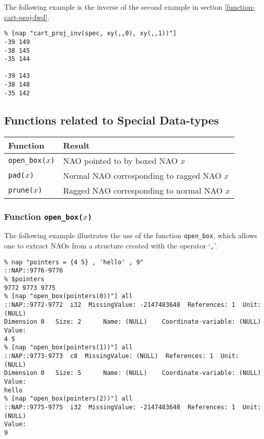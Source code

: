 The following example is the inverse of the second example in section 
\ref{function-cart-proj-fwd}.
\begin{verbatim}
% [nap "cart_proj_inv(spec, xy(,,0), xy(,,1))"]
-39 149
-38 145
-35 144

-39 143
-38 148
-35 142
\end{verbatim}

\subsection{Functions related to Special Data-types}
    \label{function-Special-Data-types}

  \begin{tabular}{|l|l|}
    \hline 
      \textbf{Function} & \textbf{Result}
    \\
      \hline 
      \hline 
        \texttt{open\_box(}$x$\texttt{)} & NAO pointed to by boxed NAO $x$
      \\
      \hline 
        \texttt{pad(}$x$\texttt{)} & Normal NAO corresponding to ragged NAO $x$
      \\
      \hline 
        \texttt{prune(}$x$\texttt{)} & Ragged NAO corresponding to normal NAO $x$
      \\
  \hline
\end{tabular}

\subsubsection{Function \texttt{open\_box(}$x$\texttt{)}}
    \label{function-open-box}

The following example illustrates the use of the function 
  \texttt{open\_box}, which allows one to extract NAOs from a
  structure created with the operator `\texttt{,}'.
  \begin{verbatim}
% nap "pointers = {4 5} , 'hello' , 9"
::NAP::9776-9776
% $pointers
9772 9773 9775
% [nap "open_box(pointers(0))"] all
::NAP::9772-9772  i32  MissingValue: -2147483648  References: 1  Unit: (NULL)
Dimension 0   Size: 2      Name: (NULL)    Coordinate-variable: (NULL)
Value:
4 5
% [nap "open_box(pointers(1))"] all
::NAP::9773-9773  c8  MissingValue: (NULL)  References: 1  Unit: (NULL)
Dimension 0   Size: 5      Name: (NULL)    Coordinate-variable: (NULL)
Value:
hello
% [nap "open_box(pointers(2))"] all
::NAP::9775-9775  i32  MissingValue: -2147483648  References: 1  Unit: (NULL)
Value:
9
\end{verbatim}


